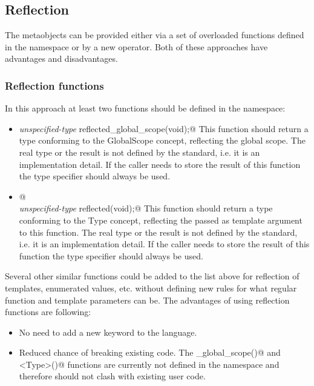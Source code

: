 \subsection{Reflection}

The metaobjects can be provided either via a set of overloaded
functions defined in the \verb@std@ namespace or by a new operator.
Both of these approaches have advantages and disadvantages.

\subsubsection{Reflection functions}

In this approach at least two functions should be defined
in the \verb@std@ namespace:

\begin{itemize}
	\item{{\em unspecified-type} \verb@ reflected_global_scope(void);@}
	This function should return a type conforming to the {\metaobject GlobalScope}
	concept, reflecting the global scope.
	The real type or the result is not defined by the standard, i.e. it is an implementation detail. 
	If the caller needs to store the result of this function the \verb@auto@ type
	specifier should always be used.

	\item{\verb@template <typename Type>@\\
	{\em unspecified-type} \verb@ reflected(void);@}
	This function should return a type conforming to the {\metaobject Type}
	concept, reflecting the \verb@Type@ passed as template argument to this function.
	The real type or the result is not defined by the standard, i.e. it is an implementation detail. 
	If the caller needs to store the result of this function the \verb@auto@ type
	specifier should always be used.
\end{itemize}

Several other similar functions could be added to the list above
for reflection of templates, enumerated values, etc. without defining
new rules for what regular function and template parameters can be.
The advantages of using reflection functions are following:

\begin{itemize}
	\item No need to add a new keyword to the language.

	\item Reduced chance of breaking existing code. The \verb@reflected_global_scope()@
	and \verb@reflected<Type>()@ functions are currently not defined in the \verb@std@
	namespace and therefore should not clash with existing user code.
\end{itemize}

